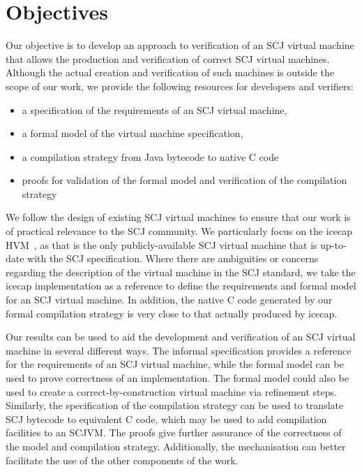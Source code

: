 \section{Objectives}

Our objective is to develop an approach to verification of an SCJ
virtual machine that allows the production and verification of correct
SCJ virtual machines.
Although the actual creation and verification of such machines is
outside the scope of our work, we provide the following resources for
developers and verifiers:
\begin{itemize}
\item a specification of the requirements of an SCJ virtual machine,
\item a formal model of the virtual machine specification,
\item a compilation strategy from Java bytecode to native C code
\item proofs for validation of the formal model and verification of
  the compilation strategy
\end{itemize}

We follow the design of existing SCJ virtual machines to ensure that
our work is of practical relevance to the SCJ community.
We particularly focus on the icecap HVM~\cite{sondergaard2012}, as
that is the only publicly-available SCJ virtual machine that is
up-to-date with the SCJ specification.
Where there are ambiguities or concerns regarding the description of
the virtual machine in the SCJ standard, we take the icecap
implementation as a reference to define the requirements and formal
model for an SCJ virtual machine.
In addition, the native C code generated by our formal compilation
strategy is very close
to that actually produced by icecap.

Our results can be used to aid the development and verification of an
SCJ virtual machine in several different ways.
The informal specification provides a reference for the requirements
of an SCJ virtual machine, while the formal model can be used to prove
correctness of an implementation.
The formal model could also be used to create a
correct-by-construction virtual machine via refinement steps.
Similarly, the specification of the compilation strategy can be used
to translate SCJ bytecode to equivalent C code, which may be used to
add compilation facilities to an SCJVM.
The proofs give further assurance of the correctness of the model and
compilation strategy.
Additionally, the mechanisation can better facilitate the use of the
other components of the work.


